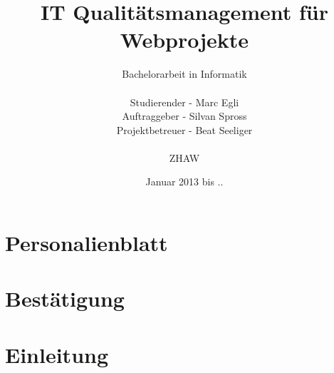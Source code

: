 \documentclass[
11pt, %
a4paper, %
BCOR10mm, %
DIV14, %
footsepline = false, %
headsepline, %
oneside, %
openright,
halfparskip, %
abstracton, %
listof=totocnumbered, %
bibliography=totocnumbered %
]{scrreprt}
\title{IT Qualitätsmanagement für Webprojekte}
\author{Bachelorarbeit in Informatik\\
    \\
    Studierender - Marc Egli\\
	Auftraggeber - Silvan Spross\\
    Projektbetreuer - Beat Seeliger\\
	\\
	ZHAW}
\date{Januar 2013 bis ..}
\begin{document}
  \ifpdf
  \else
  \fi
  
  \maketitle
  \begin{abstract}
    
  \end{abstract}

  
  \tableofcontents
  
  \chapter{Personalienblatt}
  
  
  \chapter{Bestätigung}
  
  
  \chapter{Einleitung}
  \label{cha:Einleitung}
  
  
  \appendix  
  \listoffigures
  \listoftables
  \lstlistoflistings
  
  \glsaddall
  \printglossaries
  
  \nocite{*}
  
  
\end{document}
